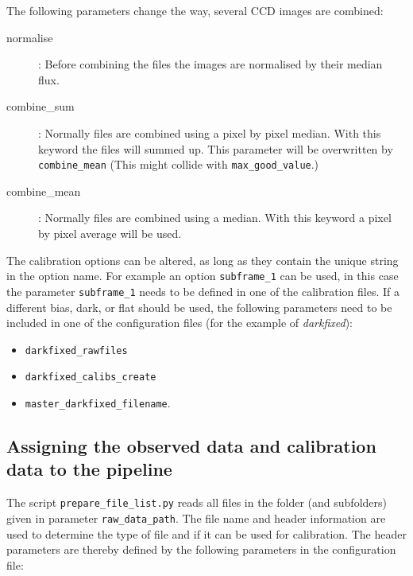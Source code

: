 \documentclass[10pt,a4paper]{article}
\begin{document}
\noindent The following parameters change the way, several CCD images are combined:
\begin{description}
  \item[normalise] : Before combining the files the images are normalised by their median flux.
  \item[combine\_sum] : Normally files are combined using a pixel by pixel median. With this keyword the files will summed up. This parameter will be overwritten by \verb|combine_mean| (This might collide with \verb|max_good_value|.)
  \item[combine\_mean] : Normally files are combined using a median. With this keyword a pixel by pixel average will be used.
\end{description}

\noindent The calibration options can be altered, as long as they contain the unique string in the option name. For example an option \verb|subframe_1| can be used, in this case the parameter \verb|subframe_1| needs to be defined in one of the calibration files. If a different bias, dark, or flat should be used, the following parameters need to be included in one of the configuration files (for the example of \textit{darkfixed}):
\begin{itemize}\setlength\itemsep{0em}
  \item \verb|darkfixed_rawfiles|
  \item \verb|darkfixed_calibs_create|
  \item \verb|master_darkfixed_filename|.
\end{itemize}


\subsection{Assigning the observed data and calibration data to the pipeline}
\label{Section:prepare_files}

The script \verb|prepare_file_list.py| reads all files in the folder (and subfolders) given in parameter \verb|raw_data_path|. The file name and header information are used to determine the type of file and if it can be used for calibration. The header parameters are thereby defined by the following parameters in the configuration file:
\end{document}

